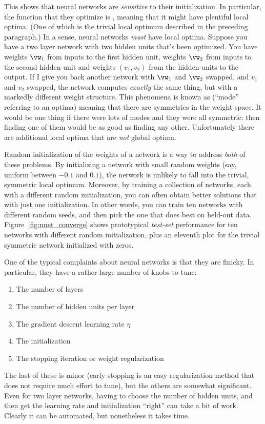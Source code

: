 This shows that neural networks are \emph{sensitive} to their
initialization.  In particular, the function that they optimize is
, meaning that it might have plentiful local
optima.  (One of which is the trivial local optimum described in the
preceding paragraph.)  In a sense, neural networks \emph{must} have
local optima.  Suppose you have a two layer network with two hidden
units that's been optimized.  You have weights $\vw_1$ from inputs to
the first hidden unit, weights $\vw_2$ from inputs to the second
hidden unit and weights $(v_1,v_2)$ from the hidden units to the
output.  If I give you back another network with $\vw_1$ and $\vw_2$
swapped, and $v_1$ and $v_2$ swapped, the network computes
\emph{exactly} the same thing, but with a markedly different weight
structure.  This phenomena is known as 
(``mode'' referring to an optima) meaning that there are symmetries in
the weight space.  It would be one thing if there were lots of modes
and they were all symmetric: then finding one of them would be as good
as finding any other.  Unfortunately there are additional local
optima that are \emph{not} global optima.


Random initialization of the weights of a network is a way to address
\emph{both} of these problems.  By initializing a network with small
random weights (say, uniform between $-0.1$ and $0.1$), the network is
unlikely to fall into the trivial, symmetric local optimum.  Moreover,
by training a collection of networks, each with a different random
initialization, you can often obtain better solutions that with just
one initialization.  In other words, you can train ten networks with
different random seeds, and then pick the one that does best on
held-out data.  Figure~\ref{fig:nnet_converge} shows prototypical
\emph{test-set} performance for ten networks with different random
initialization, plus an eleventh plot for the trivial symmetric
network initialized with zeros.

One of the typical complaints about neural networks is that they are
finicky.  In particular, they have a rather large number of knobs to
tune:
%
\begin{enumerate}
\item The number of layers
\item The number of hidden units per layer
\item The gradient descent learning rate $\eta$
\item The initialization
\item The stopping iteration or weight regularization
\end{enumerate}
%
The last of these is minor (early stopping is an easy regularization
method that does not require much effort to tune), but the others are
somewhat significant.  Even for two layer networks, having to choose
the number of hidden units, and then get the learning rate and
initialization ``right'' can take a bit of work.  Clearly it can be
automated, but nonetheless it takes time.


